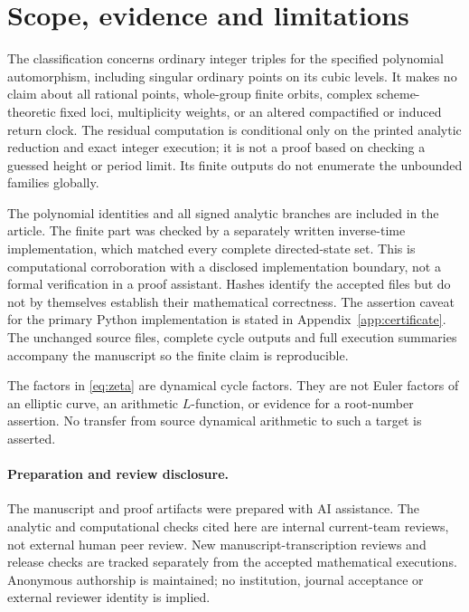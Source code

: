 \section{Scope, evidence and limitations}
\label{sec:scope}

The classification concerns ordinary integer triples for the
specified polynomial automorphism, including singular ordinary
points on its cubic levels. It makes no claim about all rational
points, whole-group finite orbits, complex scheme-theoretic
fixed loci, multiplicity weights, or an altered compactified or
induced return clock. The residual computation is conditional
only on the printed analytic reduction and exact integer
execution; it is not a proof based on checking a guessed
height or period limit. Its finite outputs do not enumerate
the unbounded families globally.

The polynomial identities and all signed analytic branches
are included in the article. The finite part was checked by
a separately written inverse-time implementation, which matched
every complete directed-state set. This is computational
corroboration with a disclosed implementation boundary, not
a formal verification in a proof assistant. Hashes identify
the accepted files but do not by themselves establish their
mathematical correctness. The assertion caveat for the primary
Python implementation is stated in
Appendix~\ref{app:certificate}. The unchanged source files,
complete cycle outputs and full execution summaries accompany
the manuscript so the finite claim is reproducible.

The factors in \eqref{eq:zeta} are dynamical cycle factors.
They are not Euler factors of an elliptic curve, an arithmetic
$L$-function, or evidence for a root-number assertion. No
transfer from source dynamical arithmetic to such a target
is asserted.

\paragraph{Preparation and review disclosure.}
The manuscript and proof artifacts were prepared with AI
assistance. The analytic and computational checks cited here
are internal current-team reviews, not external human peer
review. New manuscript-transcription reviews and release
checks are tracked separately from the accepted mathematical
executions. Anonymous authorship is maintained; no institution,
journal acceptance or external reviewer identity is implied.
